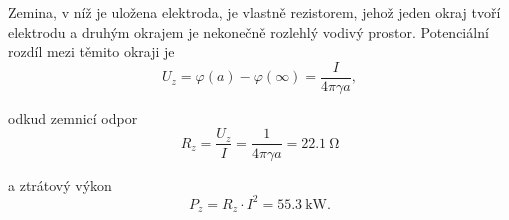 \begin{example}
  Zemina, v níž je uložena elektroda, je vlastně rezistorem, jehož jeden okraj tvoří elektrodu
  a druhým okrajem je nekonečně rozlehlý vodivý prostor. Potenciální rozdíl mezi těmito okraji je
  \begin{equation*}
    U_z = \varphi(a) - \varphi(\infty)= \frac{I}{4\pi\gamma a},
  \end{equation*} 
  \begin{minipage}[t]{0.5\textwidth}%
    odkud zemnicí odpor 
    \begin{equation*}
      R_z = \frac{U_z}{I} = \frac{1}{4\pi\gamma a} = \SI{22,1}{\ohm}
    \end{equation*}
  \end{minipage}
  \begin{minipage}[t]{0.5\textwidth}%
    a ztrátový výkon 
    \begin{equation*}
      P_z = R_z\cdot I^2 = \SI{55,3}{\kilo\watt}. 
    \end{equation*}
  \end{minipage}
\end{example}


